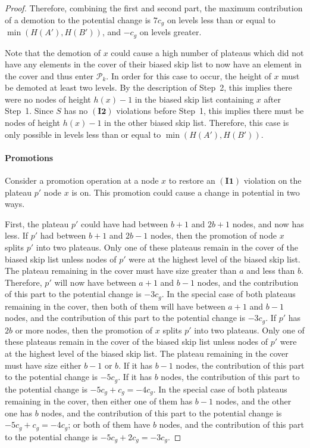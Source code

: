 \documentclass[11pt]{article}
\newcommand{\cons}[1]{\ensuremath{c_{#1}}}
\newcommand{\cnsg}{\cons g}
\newcommand{\invone}{\ensuremath{\mathbf{(I1)}}}
\newcommand{\invtwo}{\ensuremath{\mathbf{(I2)}}}
\newcommand{\nodeheight}[1]{\ensuremath{h(#1)}}
\newcommand{\intheight}[1]{\ensuremath{H(#1)}}
\newcommand{\beforeop}[1]{\ensuremath{#1'}}
\newcommand{\node}[1]{\ensuremath{#1}}
\newcommand{\bsl}[1]{\ensuremath{#1}}
\newcommand{\plats}[1]{\ensuremath{\mathcal P_{#1}}}
\begin{document}
\begin{proof}
Therefore, combining the first and second part, the maximum contribution of a demotion to the potential change is $7\cnsg$ on levels less than or equal to $\min(\intheight{\beforeop{A}},\intheight{\beforeop{B}})$, and $-\cnsg$ on levels greater. 

Note that the demotion of \node x could cause a high number of plateaus which did not have any elements in the cover of their biased skip list to now have an element in the cover and thus enter \plats k. In order for this case to occur, the height of \node x must be demoted at least two levels. By the description of Step~2, this implies there were no nodes of height $\nodeheight x - 1$ in the biased skip list containing \node x after Step~1. Since \bsl S has no \invtwo{} violations before Step~1, this implies there must be nodes of height $\nodeheight x - 1$ in the other biased skip list. Therefore, this case is only possible in levels less than or equal to $\min(\intheight{\beforeop{A}},\intheight{\beforeop{B}})$. 

\paragraph{Promotions} 
Consider a promotion operation at a node \node x to restore an \invone{} violation on the plateau $p'$ node \node x is on. This promotion could cause a change in potential in two ways. 

First, the plateau $p'$ could have had between $b+1$ and $2b+1$ nodes, and now has less. 
If $p'$ had between $b+1$ and $2b-1$ nodes, then the promotion of node \node x splits $p'$ into two plateaus. Only one of these plateaus remain in the cover of the biased skip list unless nodes of $p'$ were at the highest level of the biased skip list. 
The plateau remaining in the cover must have size greater than $a$ and less than $b$. Therefore, $p'$ will now have between $a+1$ and $b-1$ nodes, and the contribution of this part to the potential change is $-3\cnsg$. 
In the special case of both plateaus remaining in the cover, then both of them will have between $a+1$ and $b-1$ nodes, and the contribution of this part to the potential change is $-3\cnsg$. 
If $p'$ has $2b$ or more nodes, then the promotion of \node x splits $p'$ into two plateaus. Only one of these plateaus remain in the cover of the biased skip list unless nodes of $p'$ were at the highest level of the biased skip list. 
The plateau remaining in the cover must have size either $b-1$ or $b$. 
If it has $b-1$ nodes, the contribution of this part to the potential change is $-5\cnsg$. 
If it has $b$ nodes, the contribution of this part to the potential change is $-5\cnsg + \cnsg = -4\cnsg$. 
In the special case of both plateaus remaining in the cover, then either one of them has $b-1$ nodes, and the other one  has $b$ nodes, and the contribution of this part to the potential change is $-5\cnsg + \cnsg = -4\cnsg$; or both of them have $b$ nodes, and the contribution of this part to the potential change is $-5\cnsg + 2\cnsg = -3\cnsg$. 



\end{proof}
\end{document}
